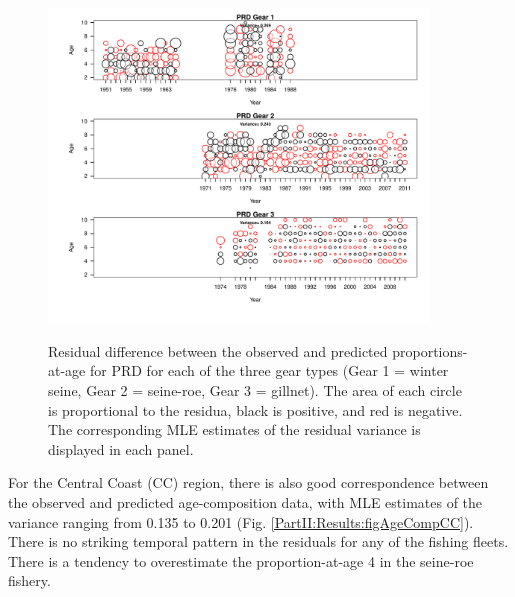 \begin{figure}
	\centering
	\includegraphics[width=0.9\textwidth]{../FIGS/qPriorFigs/iscam_fig_agecompsresid_PRD.pdf}\\
	\caption{Residual difference between the observed and predicted proportions-at-age for PRD for each of the three gear types (Gear 1 = winter seine, Gear 2 = seine-roe, Gear 3 = gillnet).  The area of each circle is proportional to the residua, black is positive, and red is negative.  The corresponding MLE estimates of the residual variance is displayed in each panel.}\label{PartII:Results:figAgeCompPRD}
\end{figure}


For the Central Coast (CC) region, there is also good correspondence between the observed and predicted age-composition data, with MLE estimates of the variance ranging from 0.135 to 0.201 (Fig. \ref{PartII:Results:figAgeCompCC}).  There is no striking temporal pattern in the residuals for any of the fishing fleets.  There is a tendency to overestimate the proportion-at-age 4 in the seine-roe fishery.


